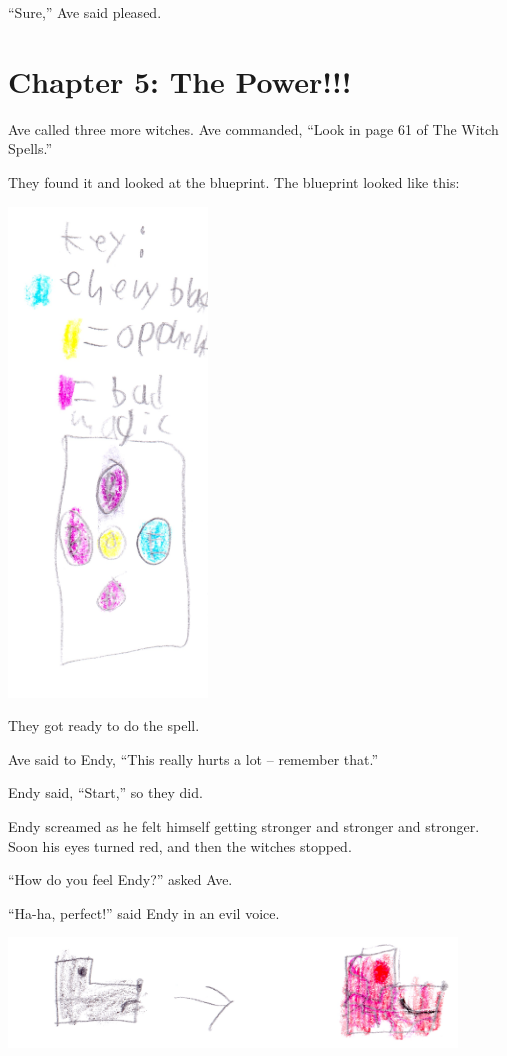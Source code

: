 \documentclass[12pt,oneside]{krantz}
\begin{document}
``Sure,'' Ave said pleased.

\hypertarget{chapter-5-the-power}{%
\chapter*{Chapter 5: The Power!!!}\label{chapter-5-the-power}}


Ave called three more witches. Ave commanded, ``Look in page 61 of The
Witch Spells.''

They found it and looked at the blueprint. The blueprint looked like
this:

\includegraphics[width=2.08333in,height=\textheight]{img/four-bad-guys/key.jpg}

They got ready to do the spell.

Ave said to Endy, ``This really hurts a lot -- remember that.''

Endy said, ``Start,'' so they did.

Endy screamed as he felt himself getting stronger and stronger and
stronger. Soon his eyes turned red, and then the witches stopped.

``How do you feel Endy?'' asked Ave.

``Ha-ha, perfect!'' said Endy in an evil voice.

\includegraphics[width=4.6875in,height=\textheight]{img/four-bad-guys/endy.jpg}
\end{document}
